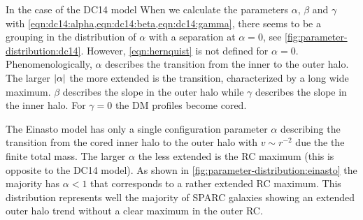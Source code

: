 In the case of the DC14 model  When we calculate the parameters $\alpha$, $\beta$ and $\gamma$ with \cref{eqn:dc14:alpha,eqn:dc14:beta,eqn:dc14:gamma}, there seems to be a grouping in the distribution of $\alpha$ with a separation at $\alpha = 0$, see \cref{fig:parameter-distribution:dc14}. However, \cref{eqn:hernquist} is not defined for $\alpha = 0$. Phenomenologically, $\alpha$ describes the transition from the inner to the outer halo. The larger $\left|\alpha\right|$ the more extended is the transition, characterized by a long wide maximum. $\beta$ describes the slope in the outer halo while $\gamma$ describes the slope in the inner halo. For $\gamma = 0$ the DM profiles become cored.

The Einasto model has only a single configuration parameter $\alpha$ describing the transition from the cored inner halo to the outer halo with $v \sim r^{-2}$ due the the finite total mass. The larger $\alpha$ the less extended is the RC maximum (this is opposite to the DC14 model). As shown in \cref{fig:parameter-distribution:einasto} the majority has $\alpha < 1$ that corresponds to a rather extended RC maximum. This distribution represents well the majority of SPARC galaxies showing an extended outer halo trend without a clear maximum in the outer RC.

